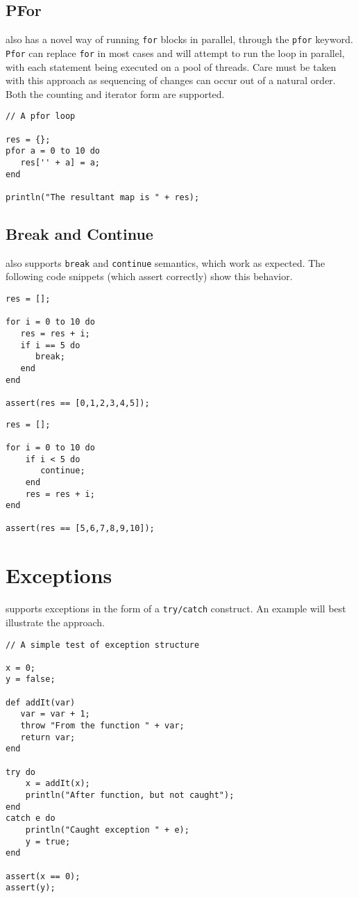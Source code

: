 \section{PFor}
\Reflex also has a novel way of running \Verb+for+ blocks in parallel, through the \verb+pfor+ keyword. \verb+Pfor+ can replace \verb+for+ in most cases and \Reflex will attempt to run the loop in parallel, with each statement being executed on a pool of threads. Care must be taken with this approach as sequencing of changes can occur out of a natural order. Both the counting and iterator form are supported.
\begin{lstlisting}[caption={PFor counting form}]
// A pfor loop

res = {};
pfor a = 0 to 10 do
   res['' + a] = a;
end

println("The resultant map is " + res);
\end{lstlisting}

\section{Break and Continue}
\Reflex also supports \Verb+break+ and \verb+continue+ semantics, which work as expected. The following code snippets (which assert correctly) show this behavior.
\begin{lstlisting}[caption={Break in for loop}]
res = [];

for i = 0 to 10 do
   res = res + i;
   if i == 5 do
      break;
   end
end

assert(res == [0,1,2,3,4,5]);
\end{lstlisting}

\begin{lstlisting}[caption={Continue in for loop}]
res = [];

for i = 0 to 10 do
    if i < 5 do
       continue;
    end
    res = res + i;
end

assert(res == [5,6,7,8,9,10]);
\end{lstlisting}

\chapter{Exceptions}
\Reflex supports exceptions in the form of a \Verb+try/catch+ construct. An example will best illustrate the approach.
\begin{lstlisting}[caption={Exception handling}]
// A simple test of exception structure

x = 0;
y = false;

def addIt(var)
   var = var + 1;
   throw "From the function " + var;
   return var;
end

try do
    x = addIt(x);
    println("After function, but not caught");
end
catch e do
    println("Caught exception " + e);
    y = true;
end

assert(x == 0);
assert(y);

\end{lstlisting}

